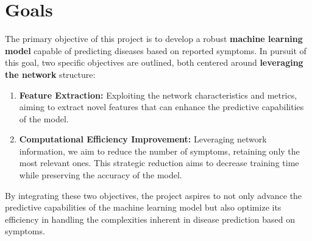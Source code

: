 

\section{Goals}

The primary objective of this project is to develop a robust \textbf{machine learning model} capable of predicting 
diseases based on reported symptoms. In pursuit of this goal, two specific objectives are outlined, 
both centered around \textbf{leveraging the network} structure:\\

\begin{enumerate}
	\setlength\itemsep{1em}
    \item \textbf{Feature Extraction:} Exploiting the network characteristics and metrics, aiming to 
    extract novel features that can enhance the predictive capabilities of the model. 
    
    \item \textbf{Computational Efficiency Improvement:} Leveraging network information, we aim to reduce 
    the number of symptoms, retaining only the most relevant ones. This strategic reduction aims to decrease 
    training time while preserving the accuracy of the model.
\end{enumerate}

\vspace{0.4cm}
By integrating these two objectives, the project aspires to not only advance the predictive capabilities of the machine 
learning model but also optimize its efficiency in handling the complexities inherent in disease prediction based on symptoms.

